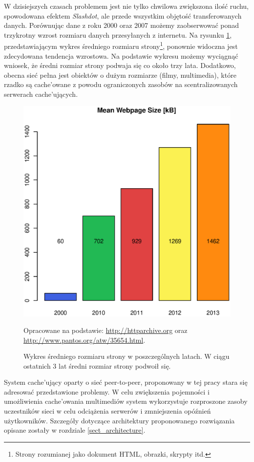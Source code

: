 \documentclass[a4paper,11pt]{scrartcl}
\newcommand{\s}{ }
\newcommand{\keszujacy}{cache'ujący}
\newcommand{\keszujacych}{cache'ujących}
\newcommand{\keszowania}{cache'owania}
\newcommand{\keszowane}{cache'owane}
\begin{document}
W dzisiejszych czasach problemem jest nie tylko chwilowa zwiększona ilość ruchu, spowodowana efektem \textit{Slashdot}, ale przede wszystkim objętość transferowanych danych. Porównując dane z roku 2000 oraz 2007 możemy zaobserwować ponad trzykrotny wzrost rozmiaru danych przesyłanych z internetu\cite{sadre2008changes}. Na rysunku \ref{fig_mean_webpage}, przedstawiającym wykres średniego rozmiaru strony\footnote{Strony rozumianej jako dokument HTML, obrazki, skrypty itd.}, ponownie widoczna jest zdecydowana tendencja wzrostowa. Na podstawie wykresu możemy wyciągnąć wniosek, że średni rozmiar strony podwaja się co około trzy lata. Dodatkowo, obecna sieć pełna jest obiektów o dużym rozmiarze (filmy, multimedia), które rzadko są \keszowane\s z powodu ograniczonych zasobów na scentralizowanych serwerach \keszujacych\cite{sadre2008changes}.

\begin{figure}[h!]
\centering
\includegraphics[width=0.7\linewidth]{img/mean_webpage_size.eps}
\caption*{Opracowane na podstawie: \url{http://httparchive.org} oraz \url{http://www.pantos.org/atw/35654.html}.}
\caption{Wykres średniego rozmiaru strony w poszczególnych latach. W ciągu ostatnich 3 lat średni rozmiar strony podwoił się.}
\label{fig_mean_webpage}
\end{figure}

System \keszujacy\s oparty o sieć peer-to-peer, proponowany w tej pracy stara się adresować przedstawione problemy. W celu zwiększenia pojemności i umożliwienia \keszowania\s multimediów system wykorzystuje rozproszone zasoby uczestników sieci w celu odciążenia serwerów i zmniejszenia opóźnień użytkowników. Szczegóły dotyczące architektury proponowanego rozwiązania opisane zostały w rozdziale \ref{sect_architecture}.
\end{document}
